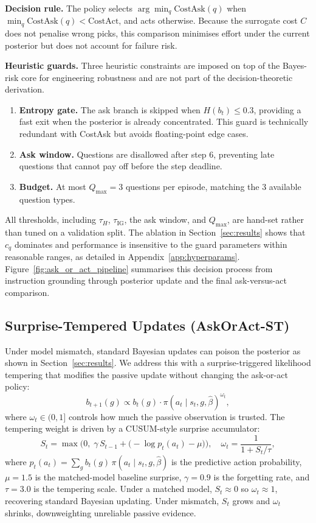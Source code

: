 \documentclass[10pt,twocolumn]{article}
\begin{document}
\textbf{Decision rule.}
The policy selects $\arg\min_q \text{CostAsk}(q)$ when $\min_q \text{CostAsk}(q) < \text{CostAct}$, and acts otherwise.
Because the surrogate cost $C$ does not penalise wrong picks, this comparison minimises effort under the current posterior but does not account for failure risk.

\textbf{Heuristic guards.}
Three heuristic constraints are imposed on top of the Bayes-risk core for engineering robustness and are not part of the decision-theoretic derivation.
\begin{enumerate}
  \item \textbf{Entropy gate.} The ask branch is skipped when $H(b_t) \leq 0.3$, providing a fast exit when the posterior is already concentrated. This guard is technically redundant with CostAsk but avoids floating-point edge cases.
  \item \textbf{Ask window.} Questions are disallowed after step 6, preventing late questions that cannot pay off before the step deadline.
  \item \textbf{Budget.} At most $Q_{\max} = 3$ questions per episode, matching the 3 available question types.
\end{enumerate}
All thresholds, including $\tau_H$, $\tau_\mathrm{IG}$, the ask window, and $Q_\mathrm{max}$, are hand-set rather than tuned on a validation split. The ablation in Section~\ref{sec:results} shows that $c_q$ dominates and performance is insensitive to the guard parameters within reasonable ranges, as detailed in Appendix~\ref{app:hyperparams}.
Figure~\ref{fig:ask_or_act_pipeline} summarises this decision process from instruction grounding through posterior update and the final ask-versus-act comparison.

\subsection{Surprise-Tempered Updates (AskOrAct-ST)}

Under model mismatch, standard Bayesian updates can poison the posterior as shown in Section~\ref{sec:results}.
We address this with a surprise-triggered likelihood tempering that modifies the passive update without changing the ask-or-act policy:
\[
  b_{t+1}(g) \propto b_t(g) \cdot \pi(a_t \mid s_t, g, \hat\beta)^{\omega_t},
\]
where $\omega_t \in (0, 1]$ controls how much the passive observation is trusted.
The tempering weight is driven by a CUSUM-style surprise accumulator:
\[
  S_t = \max\bigl(0,\; \gamma\, S_{t-1} + \bigl(-\!\log p_t(a_t) - \mu\bigr)\bigr),
  \quad \omega_t = \frac{1}{1 + S_t / \tau},
\]
where $p_t(a_t) = \sum_g b_t(g)\,\pi(a_t \mid s_t, g, \hat\beta)$ is the predictive action probability, $\mu{=}1.5$ is the matched-model baseline surprise, $\gamma{=}0.9$ is the forgetting rate, and $\tau{=}3.0$ is the tempering scale.
Under a matched model, $S_t \approx 0$ so $\omega_t \approx 1$, recovering standard Bayesian updating.
Under mismatch, $S_t$ grows and $\omega_t$ shrinks, downweighting unreliable passive evidence.
\end{document}
